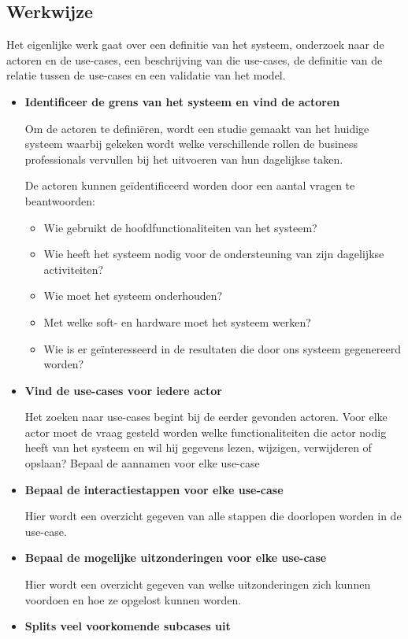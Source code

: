 \subsection{Werkwijze}

Het eigenlijke werk gaat over een definitie van het systeem, onderzoek naar de actoren en de use-cases, een beschrijving van die use-cases, de definitie van de relatie tussen de use-cases en een validatie van het model.

\begin{itemize}
\item \textbf{Identificeer de grens van het systeem en vind de actoren}

Om de actoren te definiëren, wordt een studie gemaakt van het huidige systeem waarbij gekeken wordt welke verschillende rollen de business professionals vervullen bij het uitvoeren van hun dagelijkse taken.

De actoren kunnen geïdentificeerd worden door een aantal vragen te beantwoorden: 
\begin{itemize}
    \item Wie gebruikt de hoofdfunctionaliteiten van het systeem? 
    \item Wie heeft het systeem nodig voor de ondersteuning van zijn dagelijkse activiteiten? 
    \item Wie moet het systeem onderhouden? 
    \item Met welke soft- en hardware moet het systeem werken?
    \item Wie is er geïnteresseerd in de resultaten die door ons systeem gegenereerd worden?
\end{itemize}

\item \textbf{Vind de use-cases voor iedere actor}

Het zoeken naar use-cases begint bij de eerder gevonden actoren. Voor elke actor moet de vraag gesteld worden welke functionaliteiten die actor nodig heeft van het systeem en wil hij gegevens lezen, wijzigen, verwijderen of opslaan?
Bepaal de aannamen voor elke use-case
\item \textbf{Bepaal de interactiestappen voor elke use-case}

Hier wordt een overzicht gegeven van alle stappen die doorlopen worden in de use-case.
\item \textbf{Bepaal de mogelijke uitzonderingen voor elke use-case}

Hier wordt een overzicht gegeven van welke uitzonderingen zich kunnen voordoen en hoe ze opgelost kunnen worden.
\item \textbf{Splits veel voorkomende subcases uit}


\end{itemize}
